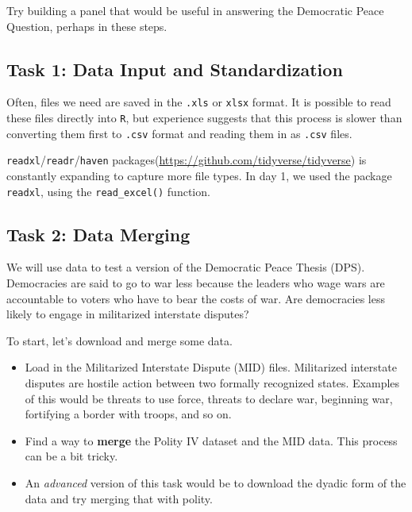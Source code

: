 \documentclass[
]{book}
\providecommand{\tightlist}{%
  \setlength{\itemsep}{0pt}\setlength{\parskip}{0pt}}
\theoremstyle{definition}
\theoremstyle{definition}
\theoremstyle{definition}
\theoremstyle{definition}
\theoremstyle{remark}
\begin{document}
Try building a panel that would be useful in answering the Democratic Peace Question, perhaps in these steps.

\hypertarget{task-1-data-input-and-standardization}{%
\subsection*{Task 1: Data Input and Standardization}\label{task-1-data-input-and-standardization}}

Often, files we need are saved in the \texttt{.xls} or \texttt{xlsx} format. It is possible to read these files directly into \texttt{R}, but experience suggests that this process is slower than converting them first to \texttt{.csv} format and reading them in as \texttt{.csv} files.

\texttt{readxl}/\texttt{readr}/\texttt{haven} packages(\url{https://github.com/tidyverse/tidyverse}) is constantly expanding to capture more file types. In day 1, we used the package \texttt{readxl}, using the \texttt{read\_excel()} function.

\hypertarget{task-2-data-merging}{%
\subsection*{Task 2: Data Merging}\label{task-2-data-merging}}

We will use data to test a version of the Democratic Peace Thesis (DPS). Democracies are said to go to war less because the leaders who wage wars are accountable to voters who have to bear the costs of war. Are democracies less likely to engage in militarized interstate disputes?

To start, let's download and merge some data.

\begin{itemize}
\tightlist
\item
  Load in the Militarized Interstate Dispute (MID) files. Militarized interstate disputes are hostile action between two formally recognized states. Examples of this would be threats to use force, threats to declare war, beginning war, fortifying a border with troops, and so on.
\item
  Find a way to \textbf{merge} the Polity IV dataset and the MID data. This process can be a bit tricky.
\item
  An \emph{advanced} version of this task would be to download the dyadic form of the data and try merging that with polity.
\end{itemize}
\end{document}

